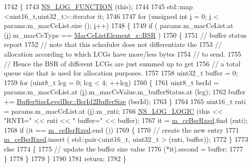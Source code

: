 \begin{DoxyCode}
1742 \{
1743   \hyperlink{log-macros-disabled_8h_a90b90d5bad1f39cb1b64923ea94c0761}{NS\_LOG\_FUNCTION} (\textcolor{keyword}{this});
1744 
1745   std::map <uint16\_t,uint32\_t>::iterator it;
1746 
1747   \textcolor{keywordflow}{for} (\textcolor{keywordtype}{unsigned} \textcolor{keywordtype}{int} \hyperlink{bernuolliDistribution_8m_a6f6ccfcf58b31cb6412107d9d5281426}{i} = 0; \hyperlink{bernuolliDistribution_8m_a6f6ccfcf58b31cb6412107d9d5281426}{i} < params.m\_macCeList.size (); \hyperlink{bernuolliDistribution_8m_a6f6ccfcf58b31cb6412107d9d5281426}{i}++)
1748     \{
1749       \textcolor{keywordflow}{if} ( params.m\_macCeList.at (\hyperlink{bernuolliDistribution_8m_a6f6ccfcf58b31cb6412107d9d5281426}{i}).m\_macCeType == \hyperlink{structns3_1_1MacCeListElement__s_a270a6526dfc7da02e9dc91823c290f6bac50796b01160b1825ec34efa1ad9f051}{MacCeListElement\_s::BSR} )
1750         \{
1751           \textcolor{comment}{// buffer status report}
1752           \textcolor{comment}{// note that this scheduler does not differentiate the}
1753           \textcolor{comment}{// allocation according to which LCGs have more/less bytes}
1754           \textcolor{comment}{// to send.}
1755           \textcolor{comment}{// Hence the BSR of different LCGs are just summed up to get}
1756           \textcolor{comment}{// a total queue size that is used for allocation purposes.}
1757 
1758           uint32\_t buffer = 0;
1759           \textcolor{keywordflow}{for} (uint8\_t lcg = 0; lcg < 4; ++lcg)
1760             \{
1761               uint8\_t bsrId = params.m\_macCeList.at (\hyperlink{bernuolliDistribution_8m_a6f6ccfcf58b31cb6412107d9d5281426}{i}).m\_macCeValue.m\_bufferStatus.at (lcg);
1762               buffer += \hyperlink{classns3_1_1BufferSizeLevelBsr_a67fc905f267ed8ac5a617fe229699122}{BufferSizeLevelBsr::BsrId2BufferSize} (bsrId);
1763             \}
1764           
1765           uint16\_t rnti = params.m\_macCeList.at (\hyperlink{bernuolliDistribution_8m_a6f6ccfcf58b31cb6412107d9d5281426}{i}).m\_rnti;
1766           \hyperlink{group__logging_ga88acd260151caf2db9c0fc84997f45ce}{NS\_LOG\_LOGIC} (\textcolor{keyword}{this} << \textcolor{stringliteral}{"RNTI="} << rnti << \textcolor{stringliteral}{" buffer="} << buffer);
1767           it = \hyperlink{classns3_1_1TdBetFfMacScheduler_ab10364d54dad2ec2afed0c168cdad4d3}{m\_ceBsrRxed}.find (rnti);
1768           \textcolor{keywordflow}{if} (it == \hyperlink{classns3_1_1TdBetFfMacScheduler_ab10364d54dad2ec2afed0c168cdad4d3}{m\_ceBsrRxed}.end ())
1769             \{
1770               \textcolor{comment}{// create the new entry}
1771               \hyperlink{classns3_1_1TdBetFfMacScheduler_ab10364d54dad2ec2afed0c168cdad4d3}{m\_ceBsrRxed}.insert ( std::pair<uint16\_t, uint32\_t > (rnti, buffer));
1772             \}
1773           \textcolor{keywordflow}{else}
1774             \{
1775               \textcolor{comment}{// update the buffer size value}
1776               (*it).second = buffer;
1777             \}
1778         \}
1779     \}
1780 
1781   \textcolor{keywordflow}{return};
1782 \}
\end{DoxyCode}


